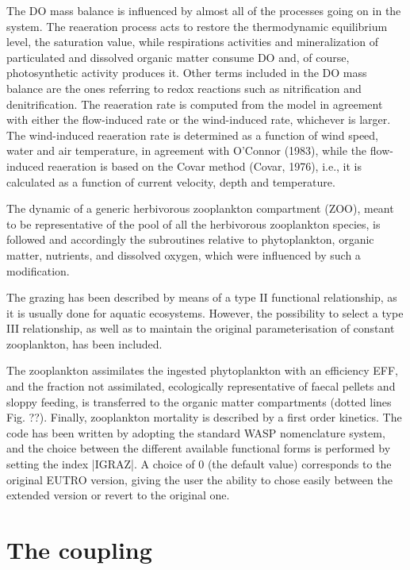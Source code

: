 The DO mass balance is influenced by almost all of the processes 
going on in the system. The reaeration process acts to restore 
the thermodynamic equilibrium level, the saturation value, while 
respirations activities and mineralization of particulated and 
dissolved organic matter consume DO and, of course, photosynthetic 
activity produces it. Other terms included in the DO mass balance 
are the ones referring to redox reactions such as nitrification 
and denitrification. The reaeration rate is computed from the 
model in agreement with either the flow-induced rate or the wind-induced 
rate, whichever is larger. The wind-induced reaeration rate is 
determined as a function of wind speed, water and air temperature, 
in agreement with O'Connor (1983), while the flow-induced reaeration 
is based on the Covar method (Covar, 1976), i.e., it is calculated 
as a function of current velocity, depth and temperature.

The dynamic of a generic herbivorous zooplankton compartment 
(ZOO), meant to be representative of the pool of all the herbivorous 
zooplankton species, is followed and accordingly the subroutines 
relative to phytoplankton, organic matter, nutrients, and dissolved 
oxygen, which were influenced by such a modification. 

The grazing has been described by means of a type II functional 
relationship, as it is usually done for aquatic ecosystems. However, 
the possibility to select a type III relationship, as well as 
to maintain the original parameterisation of constant zooplankton, 
has been included.  

The zooplankton assimilates the ingested phytoplankton with an 
efficiency EFF, and the fraction not assimilated, ecologically 
representative of faecal pellets and sloppy feeding, is transferred 
to the organic matter compartments (dotted lines Fig. ??). Finally, 
zooplankton mortality is described by a first order kinetics. 
The code has been written by adopting the standard WASP nomenclature 
system, and the choice between the different available functional 
forms is performed by setting the index |IGRAZ|. A choice of 0 
(the default value) corresponds to the original EUTRO version, 
giving the user the ability to chose easily between the extended 
version or revert to the original one.





\section{The coupling}


